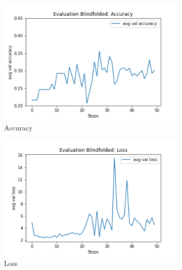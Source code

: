 \begin{figure}[h]
     \centering
     \begin{subfigure}[b]{0.3\textwidth}
         \centering
         \includegraphics[width=\textwidth]{./figure/results/baseline_and_blindfolding/blindfolded/avg val accuracy.png}
         \caption{Accuracy}
         \label{fig:blindfolded_accuracy}
     \end{subfigure}
     \hfill
     \begin{subfigure}[b]{0.3\textwidth}
         \centering
         \includegraphics[width=\textwidth]{./figure/results/baseline_and_blindfolding/blindfolded/avg val loss.png}
         \caption{Loss}
         \label{fig:blindfolded_loss}
     \end{subfigure}
     \hfill
     \begin{subfigure}[b]{0.3\textwidth}
         \centering

\end{subfigure}
\end{figure}

